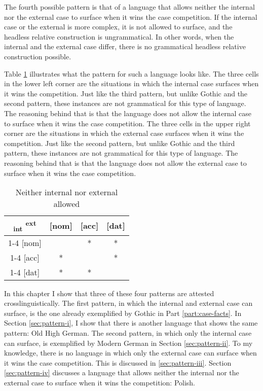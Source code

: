 The fourth possible pattern is that of a language that allows neither the internal nor the external case to surface when it wins the case competition. If the internal case or the external is more complex, it is not allowed to surface, and the headless relative construction is ungrammatical. In other words, when the internal and the external case differ, there is no grammatical headless relative construction possible.

Table \ref{tbl:case-competition-none} illustrates what the pattern for such a language looks like.
The three cells in the lower left corner are the situations in which the internal case surfaces when it wins the competition. Just like the third pattern, but unlike Gothic and the second pattern, these instances are not grammatical for this type of language. The reasoning behind that is that the language does not allow the internal case to surface when it wins the case competition.
The three cells in the upper right corner are the situations in which the external case surfaces when it wins the competition. Just like the second pattern, but unlike Gothic and the third pattern, these instances are not grammatical for this type of language. The reasoning behind that is that the language does not allow the external case to surface when it wins the case competition.

\begin{table}[H]
  \center
  \caption{Neither internal nor external allowed}
  \begin{tabular}{c|c|c|c}
    \toprule
    \textsubscript{\ac{int}} \textsuperscript{\ac{ext}}
           & [\ac{nom}]
           & [\ac{acc}]
           & [\ac{dat}]
           \\ \cmidrule{1-4}
       [\ac{nom}]
           & \xcancel{\phantom{xx}}
           & *
           & *
           \\ \cmidrule{1-4}
       [\ac{acc}]
           & *
           & \xcancel{\phantom{xx}}
           & *
           \\ \cmidrule{1-4}
       [\ac{dat}]
           & *
           & *
           & \xcancel{\phantom{xx}}
           \\
     \bottomrule
  \end{tabular}
    \label{tbl:case-competition-none}
\end{table}

In this chapter I show that three of these four patterns are attested crosslinguistically. The first pattern, in which the internal and external case can surface, is the one already exemplified by Gothic in Part \ref{part:case-facts}. In Section \ref{sec:pattern-i}, I show that there is another language that shows the same pattern: Old High German. The second pattern, in which only the internal case can surface, is exemplified by Modern German in Section \ref{sec:pattern-ii}. To my knowledge, there is no language in which only the external case can surface when it wins the case competition. This is discussed in \ref{sec:pattern-iii}. Section \ref{sec:pattern-iv} discusses a language that allows neither the internal nor the external case to surface when it wins the competition: Polish.

